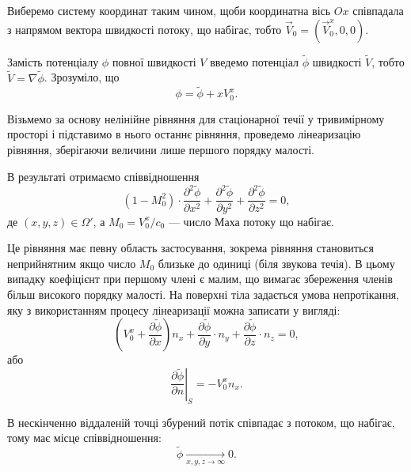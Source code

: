 Виберемо систему координат таким чином, щоби координатна вісь $Ox$ співпадала з напрямом вектора швидкості потоку, що набігає, тобто $\vec V_0 = (\vec V_0^x, 0, 0)$. \medskip

Замість потенціалу $\phi$ повної швидкості $V$ введемо потенціал $\tilde \phi$ швидкості $\tilde V$, тобто $\tilde V = \nabla \tilde \phi$. Зрозуміло, що
\begin{equation}
	\phi = \tilde \phi + x V_0^x.
\end{equation}

Візьмемо за основу нелінійне рівняння для стаціонарної течії у тривимірному просторі і підставимо в нього останнє рівняння, проведемо лінеаризацію рівняння, зберігаючи величини лише першого порядку малості. \medskip

В результаті отримаємо співвідношення
\begin{equation}
	(1 - M_0^2) \cdot \frac{\partial^2 \tilde \phi}{\partial x^2} + \frac{\partial^2 \tilde \phi}{\partial y^2} + \frac{\partial^2 \tilde \phi}{\partial z^2} = 0,
\end{equation}
де $(x, y, z) \in \Omega'$, а $M_0 = V_0^x / c_0$ --- число Маха потоку що набігає.  \medskip

Це рівняння має певну область застосування, зокрема рівняння становиться неприйнятним якщо число $M_0$ близьке до одиниці (біля звукова течія). В цьому випадку коефіцієнт при першому члені є малим, що вимагає збереження членів більш високого порядку малості. На поверхні тіла задається умова непротікання, яку з використанням процесу лінеаризації можна записати у вигляді:
\begin{equation}
	\left( V_0^x + \frac{\partial \tilde \phi}{\partial x} \right) n_x + \frac{\partial \tilde \phi}{\partial y} \cdot n_y  + \frac{\partial \tilde \phi}{\partial z} \cdot n_z  = 0,
\end{equation}
або
\begin{equation}
	\left. \frac{\partial \tilde \phi}{\partial n} \right|_S = -V_0^x n_x.
\end{equation}

В нескінченно віддаленій точці збурений потік співпадає з потоком, що набігає, тому має місце співвідношення:
\begin{equation}
	\tilde \phi \xrightarrow[x, y, z \to \infty]{} 0.
\end{equation}

% 